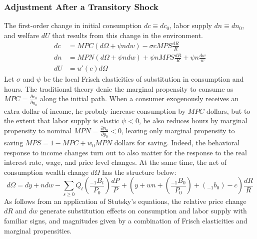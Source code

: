 \documentclass[11pt,letterpaper]{article}
\begin{document}
\subsubsection{Adjustment After a Transitory Shock}
The first-order change in initial consumption $dc \equiv dc_{0}$, labor supply $dn \equiv dn_{0}$, and welfare $dU$ that results from this change in the environment. 
\begin{align}
	\label{e3} dc &= MPC(d\Omega + \psi ndw) - \sigma c MPS \frac{dR}{R} \\ 
	\label{e4} dn &= MPN(d\Omega + \psi ndw) + \psi n MPS \frac{dR}{R} + \psi n \frac{dw}{w} \\ 
    \label{e5} dU &= u' (c) d \Omega 
\end{align}
Let $\sigma$ and $\psi$ be the local Frisch elasticities of substitution in consumption and hours. The traditional theory denie the marginal propensity to consume as $MPC =\frac{\partial c_{0}}{\partial y_{0}}$ along the initial path. When a consumer exogenously receives an extra dollar of income, he probaly increase consumption by $MPC$ dollars, but to the extent that labor supply is elastic $\psi <0$, he also reduces hours by marginal propensity to nominal $MPN = \frac{\partial n_{0}}{\partial y_{0}} <0$, leaving only marginal propensity to saving $MPS = 1 - MPC + w_{0}MPN$ dollars for saving. Indeed, the behavioral response to income changes turn out to also matter for the response to the real interest rate, wage, and price level changes. At the same time, the net of consumption wealth change $d\Omega$ has the structure below: 
\begin{equation}\label{e6}
	d\Omega = dy +ndw - \sum_{s \geqslant 0}Q_{t}\left(\frac{_{-1}B_{t}}{P_{0}}\right) \frac{dP}{P} + \left(y + wn + \left(\frac{_{-1}B_{0}}{P_{0}}\right) + (_{-1}b_{0}) - c\right) \frac{dR}{R}
\end{equation}
As follows from an application of Stutsky's equations, the relative price change $dR$ and $dw$ generate substitution effects on consumption and labor supply with familiar signs, and magnitudes given by a combination of Frisch elasticities and marginal propensities. 
\end{document}

